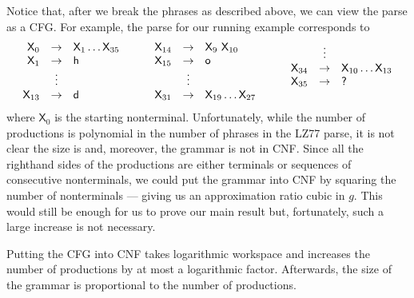 \documentclass[runningheads]{llncs}
\newcommand{\sfX}{\ensuremath{\mathsf{X}}}
\begin{document}
Notice that, after we break the phrases as described above, we can view the parse as a CFG.  For example, the parse for our running example corresponds to
\[\begin{array}{l@{\hspace{5ex}}l@{\hspace{5ex}}l}
\begin{array}{rcl}
\sfX_0 & \rightarrow & \sfX_1 \ldots \sfX_{35}\\
\sfX_1 & \rightarrow & \mathsf{h}\\
& \vdots &\\
\sfX_{13} & \rightarrow & \mathsf{d}
\end{array} &
\begin{array}{rcl}
\sfX_{14} & \rightarrow & \sfX_9\ \sfX_{10}\\
\sfX_{15} & \rightarrow & \mathsf{o}\\
& \vdots &\\
\sfX_{31} & \rightarrow & \sfX_{19} \ldots \sfX_{27}
\end{array} &
\begin{array}{rcl}
& \vdots &\\
\sfX_{34} & \rightarrow & \sfX_{10} \ldots \sfX_{13}\\
\sfX_{35} & \rightarrow & \mbox{\sf ?}\\
&&
\end{array}
\end{array}\]
where $\sfX_0$ is the starting nonterminal.  Unfortunately, while the number of productions is polynomial in the number of phrases in the LZ77 parse, it is not clear the size is and, moreover, the grammar is not in CNF.  Since all the righthand sides of the productions are either terminals or sequences of consecutive nonterminals, we could put the grammar into CNF by squaring the number of nonterminals --- giving us an approximation ratio cubic in $g$.  This would still be enough for us to prove our main result but, fortunately, such a large increase is not necessary.

\begin{lemma} \label{lem:cnf}
Putting the CFG into CNF takes logarithmic workspace and increases the number of productions by at most a logarithmic factor.  Afterwards, the size of the grammar is proportional to the number of productions.
\end{lemma}
\end{document}
